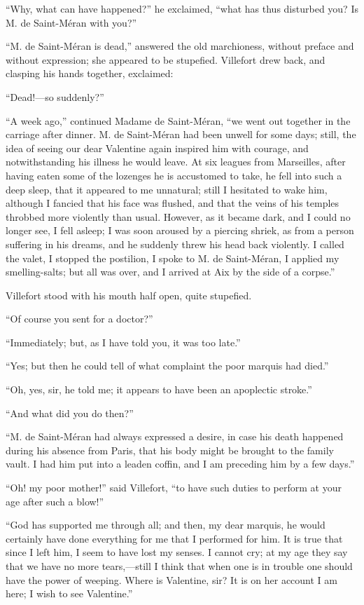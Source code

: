 “Why, what can have happened?” he exclaimed, “what has thus disturbed
you? Is M. de Saint-Méran with you?”

“M. de Saint-Méran is dead,” answered the old marchioness, without
preface and without expression; she appeared to be stupefied. Villefort
drew back, and clasping his hands together, exclaimed:

“Dead!—so suddenly?”

“A week ago,” continued Madame de Saint-Méran, “we went out together in
the carriage after dinner. M. de Saint-Méran had been unwell for some
days; still, the idea of seeing our dear Valentine again inspired him
with courage, and notwithstanding his illness he would leave. At six
leagues from Marseilles, after having eaten some of the lozenges he is
accustomed to take, he fell into such a deep sleep, that it appeared to
me unnatural; still I hesitated to wake him, although I fancied that
his face was flushed, and that the veins of his temples throbbed more
violently than usual. However, as it became dark, and I could no longer
see, I fell asleep; I was soon aroused by a piercing shriek, as from a
person suffering in his dreams, and he suddenly threw his head back
violently. I called the valet, I stopped the postilion, I spoke to M.
de Saint-Méran, I applied my smelling-salts; but all was over, and I
arrived at Aix by the side of a corpse.”

Villefort stood with his mouth half open, quite stupefied.

“Of course you sent for a doctor?”

“Immediately; but, as I have told you, it was too late.”

“Yes; but then he could tell of what complaint the poor marquis had
died.”

“Oh, yes, sir, he told me; it appears to have been an apoplectic
stroke.”

“And what did you do then?”

“M. de Saint-Méran had always expressed a desire, in case his death
happened during his absence from Paris, that his body might be brought
to the family vault. I had him put into a leaden coffin, and I am
preceding him by a few days.”

“Oh! my poor mother!” said Villefort, “to have such duties to perform
at your age after such a blow!”

“God has supported me through all; and then, my dear marquis, he would
certainly have done everything for me that I performed for him. It is
true that since I left him, I seem to have lost my senses. I cannot
cry; at my age they say that we have no more tears,—still I think that
when one is in trouble one should have the power of weeping. Where is
Valentine, sir? It is on her account I am here; I wish to see
Valentine.”

